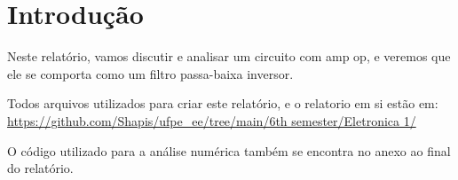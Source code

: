 \section{Introdução}


Neste relatório, vamos discutir e analisar um circuito com amp op, e veremos que ele se comporta como um filtro passa-baixa inversor.


Todos arquivos utilizados para criar este relatório, e o relatorio em si estão em:  \url{https://github.com/Shapis/ufpe_ee/tree/main/6th semester/Eletronica 1/}


O código utilizado para a análise numérica também se encontra no anexo ao final do relatório.